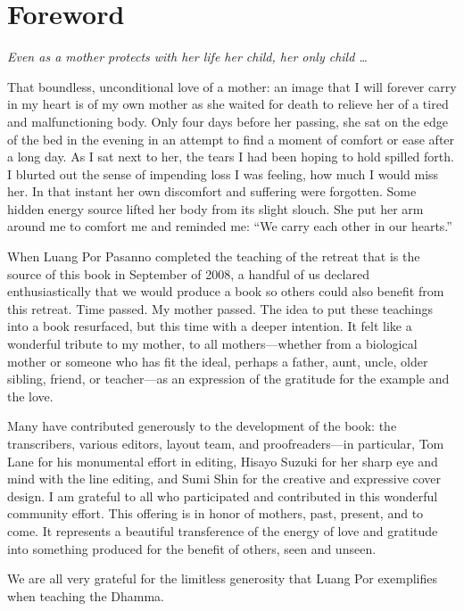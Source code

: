 \chapter{Foreword}

{\center
\emph{Even as a mother protects with her life her child, her only child
\ldots{}}

}

\vspace{1em}\noindent
That boundless, unconditional love of a mother: an image that I will
forever carry in my heart is of my own mother as she waited for death to
relieve her of a tired and malfunctioning body. Only four days before
her passing, she sat on the edge of the bed in the evening in an attempt
to find a moment of comfort or ease after a long day. As I sat next to
her, the tears I had been hoping to hold spilled forth. I blurted out
the sense of impending loss I was feeling, how much I would miss her. In
that instant her own discomfort and suffering were forgotten. Some
hidden energy source lifted her body from its slight slouch. She put her
arm around me to comfort me and reminded me: “We carry each other in our
hearts.”

When Luang Por Pasanno completed the teaching of the retreat that is the
source of this book in September of 2008, a handful of us declared
enthusiastically that we would produce a book so others could also
benefit from this retreat. Time passed. My mother passed. The idea to
put these teachings into a book resurfaced, but this time with a deeper
intention. It felt like a wonderful tribute to my mother, to all
mothers—whether from a biological mother or someone who has fit the
ideal, perhaps a father, aunt, uncle, older sibling, friend, or
teacher—as an expression of the gratitude for the example and the love.

Many have contributed generously to the development of the book: the
transcribers, various editors, layout team, and proofreaders—in
particular, Tom Lane for his monumental effort in editing, Hisayo Suzuki
for her sharp eye and mind with the line editing, and Sumi Shin for the
creative and expressive cover design. I am grateful to all who
participated and contributed in this wonderful community effort. This
offering is in honor of mothers, past, present, and to come. It
represents a beautiful transference of the energy of love and gratitude
into something produced for the benefit of others, seen and unseen.

We are all very grateful for the limitless generosity that Luang Por
exemplifies when teaching the Dhamma.
